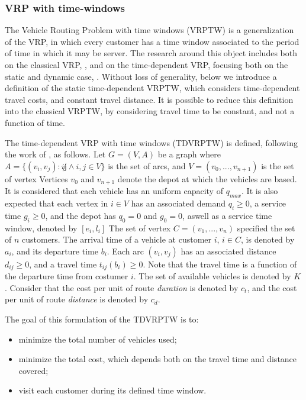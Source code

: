 \subsubsection{VRP with time-windows}
\label{sec:time-windows-vrp}

The Vehicle Routing Problem with time windows (VRPTW) is a generalization of the VRP,
in which every customer has a time window associated to the period of time in which it may be server.
The research around this object includes both on the classical VRP, \cite{vrptw_1} \cite{vrptw_2}, and on the time-dependent VRP,
focusing both on the static \cite{tdvrptw_1} and dynamic case, \cite{dynamic_vrptw} \cite{dynamic_vrp_review}. Without loss of generality,
below we introduce a definition of the static time-dependent VRPTW, which considers time-dependent travel costs,
and constant travel distance. It is possible to reduce this definition into the classical VRPTW,
by considering travel time to be constant, and not a function of time.

The time-dependent VRP with time windows (TDVRPTW) is defined, following the work of \cite{tdvrptw_1}, as follows.
Let $G=(V,A)$ be a graph where $A=\{(v_i, v_j): i \not j \wedge i,j \in V\}$
is the set of arcs, and $V = (v_0, ..., v_{n+1})$ is the set of vertex
Vertices $v_{0}$ and $v_{n+1}$ denote the depot at which the vehicles are based.
It is considered that each vehicle has an uniform capacity of $q_{max}$.
It is also expected that each vertex in $i \in V$ has an associated demand $q_i \geq 0$,
a service time $g_i \geq 0$, and the depot has $q_0 = 0$ and $g_0 = 0$,
aswell as a service time window, denoted by $[e_i, l_i]$
The set of vertex $ C = (v_1, ..., v_{n})$ specified the set of $n$ customers.
The arrival time of a vehicle at customer $i$, $i \in C$, is denoted by $a_i$,
and its departure time $b_i$. Each arc $(v_i, v_j)$ has an associated distance $d_{ij} \geq 0$,
and a travel time $t_{ij}(b_i) \geq 0$. Note that the travel time is a function 
of the departure time from costumer $i$.
The set of available vehicles is denoted by $K$. 
Consider that the cost per unit of route \textit{duration} is denoted by $c_{t}$,
and the cost per unit of route \textit{distance} is denoted by $c_{d}$. 

The goal of this formulation of the TDVRPTW is to: 

\begin{itemize}
  \item  minimize the total number of vehicles used; 
  \item minimize  the total cost, which depends both on the travel time and distance covered;
  \item visit each customer during its defined time window.
\end{itemize}




